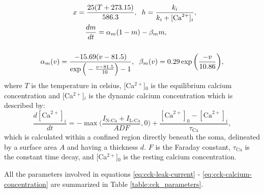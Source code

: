 \documentclass[../main.tex]{subfiles}
\begin{document}
\begin{itemize}
\begin{equation}
\begin{aligned}
\begin{split}
            &\hspace{1.6cm}x = \displaystyle\frac{25(T+273.15)}{586.3}, \hspace{0.2cm} h = \displaystyle\frac{k_i}{k_i+[\text{Ca}^{2+}]_i},\\
            &\hspace{2.2cm}\displaystyle\frac{dm}{dt} = \alpha_m(1-m)-\beta_mm,\\
            & \\
            &\alpha_m(v) = \displaystyle\frac{-15.69(v-81.5)}{\exp{\Big(-\frac{v-81.5}{10}\Big)}-1},\hspace{0.2cm} 
            \beta_m(v)  = 0.29\exp{\bigg(\displaystyle\frac{-v}{10.86} \bigg)}, \\
        \end{split}
        \end{aligned}
        \label{eq:cck-L-current}
        \end{equation}
    where $T$ is the temperature in celsius, [Ca$^{2+}$]$_0$ is the equilibrium calcium concentration and [Ca$^{2+}$]$_i$ is the dynamic calcium concentration which is described by:
    \begin{equation}
        \displaystyle\frac{d[\text{Ca}^{2+}]_i}{dt} = -\max\bigg(\displaystyle\frac{I_\text{N-Ca}+I_\text{L-Ca}}{ADF},0\bigg) + \displaystyle\frac{[\text{Ca}^{2+}]_0-[\text{Ca}^{2+}]_i}{\tau_\text{Ca}},
        \label{eq:cck-calcium-concentration}
    \end{equation}
    which is calculated within a confined region directly beneath the soma, delineated by a surface area $A$ and having a thickness $d$.  $F$ is the Faraday constant, $\tau_\text{Ca}$ is the constant time decay, and [Ca$^{2+}$]$_{0}$ is the resting calcium concentration.
\end{itemize}
 All the parameters involved in equations \eqref{eq:cck-leak-current} - \eqref{eq:cck-calcium-concentration} are summarized in Table \ref{table:cck_parameters}.
 \clearpage
\end{document}
